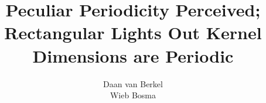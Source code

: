 \title{Peculiar Periodicity Perceived; Rectangular Lights Out Kernel Dimensions are Periodic}
\author{Daan van Berkel\\Wieb Bosma}
